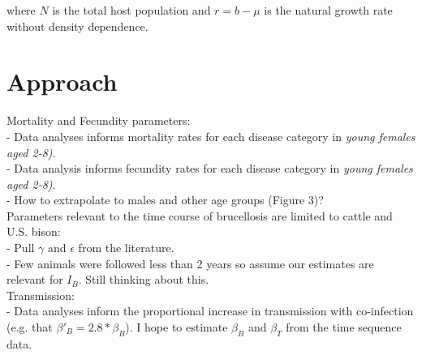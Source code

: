 \documentclass[letterpaper,12pt]{article}
\begin{document}
where $N$ is the total host population and $r=b-\mu$ is the natural growth rate without density dependence.




\section*{Approach}
Mortality and Fecundity parameters: \\
- Data analyses informs mortality rates for each disease category in \textit{young females aged 2-8)}.  \\
- Data analysis informs fecundity rates for each disease category in \textit{young females aged 2-8)}.  \\
- How to extrapolate to males and other age groups (Figure 3)?  \\
Parameters relevant to the time course of brucellosis are limited to cattle and U.S. bison: \\
- Pull $\gamma$ and $\epsilon$ from the literature.  \\
- Few animals were followed less than 2 years so assume our estimates are relevant for $I_B$.  Still thinking about this. \\
Transmission: \\
- Data analyses inform the proportional increase in transmission with co-infection (e.g. that $\beta'_B = 2.8 * \beta_B$).
 I hope to estimate $\beta_B$ and $\beta_T$ from the time sequence data.
\end{document}
